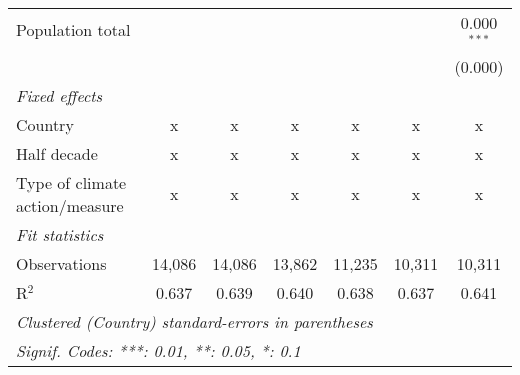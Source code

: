 \begin{tabular}{lcccccc}
   Population total                                           &                &                &                &               &               & 0.000$^{***}$\\   
                                                              &                &                &                &               &               & (0.000)\\   
   \emph{Fixed effects}\\
   Country                                                    & x              & x              & x              & x             & x             & x\\  
   Half decade                                                & x              & x              & x              & x             & x             & x\\  
   Type of climate action/measure                             & x              & x              & x              & x             & x             & x\\  
   \midrule \emph{Fit statistics}\\
   Observations                                               & 14,086         & 14,086         & 13,862         & 11,235        & 10,311        & 10,311\\  
   R$^2$                                                      & 0.637          & 0.639          & 0.640          & 0.638         & 0.637         & 0.641\\  
   \midrule
   \multicolumn{7}{l}{\emph{Clustered (Country) standard-errors in parentheses}}\\
   \multicolumn{7}{l}{\emph{Signif. Codes: ***: 0.01, **: 0.05, *: 0.1}}\\
\end{tabular}
\par\endgroup


